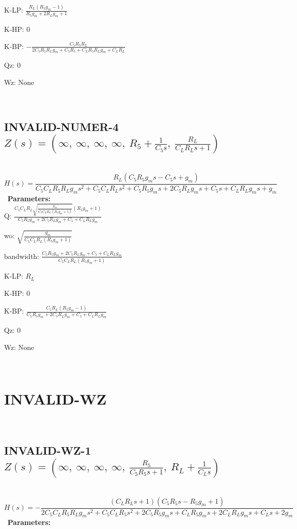 \documentclass{article}
\begin{document}
K-LP: $\frac{R_{L} \left(R_{5} g_{m} - 1\right)}{R_{5} g_{m} + 2 R_{L} g_{m} + 1}$\ 

K-HP: $0$\ 

K-BP: $- \frac{C_{5} R_{5} R_{L}}{2 C_{5} R_{5} R_{L} g_{m} + C_{5} R_{5} + C_{L} R_{5} R_{L} g_{m} + C_{L} R_{L}}$\ 

Qz: $0$\ 

Wz: $\text{None}$\ 

\ 

\subsection{INVALID-NUMER-4 $Z(s) = \left( \infty, \  \infty, \  \infty, \  \infty, \  R_{5} + \frac{1}{C_{5} s}, \  \frac{R_{L}}{C_{L} R_{L} s + 1}\right)$ } \ 
\textbf{\[H(s) = \frac{R_{L} \left(C_{5} R_{5} g_{m} s - C_{5} s + g_{m}\right)}{C_{5} C_{L} R_{5} R_{L} g_{m} s^{2} + C_{5} C_{L} R_{L} s^{2} + C_{5} R_{5} g_{m} s + 2 C_{5} R_{L} g_{m} s + C_{5} s + C_{L} R_{L} g_{m} s + g_{m}}\] } \ 
\textbf{Parameters:}\\ 

Q: $\frac{C_{5} C_{L} R_{L} \sqrt{\frac{g_{m}}{C_{5} C_{L} R_{L} \left(R_{5} g_{m} + 1\right)}} \left(R_{5} g_{m} + 1\right)}{C_{5} R_{5} g_{m} + 2 C_{5} R_{L} g_{m} + C_{5} + C_{L} R_{L} g_{m}}$\ 

wo: $\sqrt{\frac{g_{m}}{C_{5} C_{L} R_{L} \left(R_{5} g_{m} + 1\right)}}$\ 

bandwidth: $\frac{C_{5} R_{5} g_{m} + 2 C_{5} R_{L} g_{m} + C_{5} + C_{L} R_{L} g_{m}}{C_{5} C_{L} R_{L} \left(R_{5} g_{m} + 1\right)}$\ 

K-LP: $R_{L}$\ 

K-HP: $0$\ 

K-BP: $\frac{C_{5} R_{L} \left(R_{5} g_{m} - 1\right)}{C_{5} R_{5} g_{m} + 2 C_{5} R_{L} g_{m} + C_{5} + C_{L} R_{L} g_{m}}$\ 

Qz: $0$\ 

Wz: $\text{None}$\ 

\ 

\section{INVALID-WZ}\ 
\subsection{INVALID-WZ-1 $Z(s) = \left( \infty, \  \infty, \  \infty, \  \infty, \  \frac{R_{5}}{C_{5} R_{5} s + 1}, \  R_{L} + \frac{1}{C_{L} s}\right)$ } \ 
\textbf{\[H(s) = - \frac{\left(C_{L} R_{L} s + 1\right) \left(C_{5} R_{5} s - R_{5} g_{m} + 1\right)}{2 C_{5} C_{L} R_{5} R_{L} g_{m} s^{2} + C_{5} C_{L} R_{5} s^{2} + 2 C_{5} R_{5} g_{m} s + C_{L} R_{5} g_{m} s + 2 C_{L} R_{L} g_{m} s + C_{L} s + 2 g_{m}}\] } \ 
\textbf{Parameters:}\\ 
\end{document}
